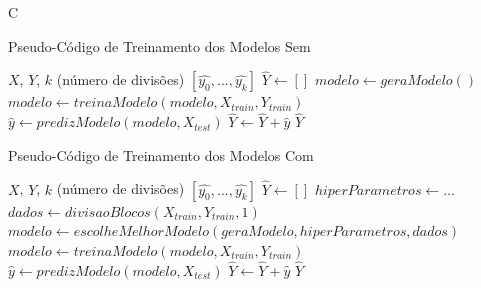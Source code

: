 C 

\begin{algorithm}
\label{algo:training}
\caption{Pseudo-Código de Treinamento dos Modelos Sem }
\begin{algorithmic}
\REQUIRE $X$, $Y$, $k$ (número de divisões)
\ENSURE $[\hat{y_0}, ..., \hat{y_k}]$
\STATE $\hat{Y} \leftarrow [] $
\newline
{} 
    \STATE $modelo \leftarrow geraModelo()$
    \STATE $modelo \leftarrow treinaModelo(modelo, X_{train}, Y_{train})$ 
    \newline
    \STATE $\hat{y} \leftarrow predizModelo(modelo, X_{test}) $
    \STATE $\hat{Y} \leftarrow \hat{Y} + \hat{y}$
\ENDFOR
\newline
\RETURN $\hat{Y}$
\end{algorithmic}
\end{algorithm}

\begin{algorithm}
\label{algo:tuned_training}
\caption{Pseudo-Código de Treinamento dos Modelos Com }
\begin{algorithmic}
\REQUIRE $X$, $Y$, $k$ (número de divisões)
\ENSURE $[\hat{y_0}, ..., \hat{y_k}]$
\STATE $\hat{Y} \leftarrow [] $ 
\newline
{} 
    \STATE $hiperParametros \leftarrow {...}$
    \STATE $dados \leftarrow divisaoBlocos(X_{train}, Y_{train}, 1)$
    \STATE $modelo \leftarrow escolheMelhorModelo(geraModelo, hiperParametros, dados)$
    \newline
    \STATE $modelo \leftarrow treinaModelo(modelo, X_{train}, Y_{train})$ 
    \newline
    \STATE $\hat{y} \leftarrow predizModelo(modelo, X_{test}) $
    \STATE $\hat{Y} \leftarrow \hat{Y} + \hat{y}$
    \newline
\ENDFOR
\newline
\RETURN $\hat{Y}$
\end{algorithmic}
\end{algorithm}